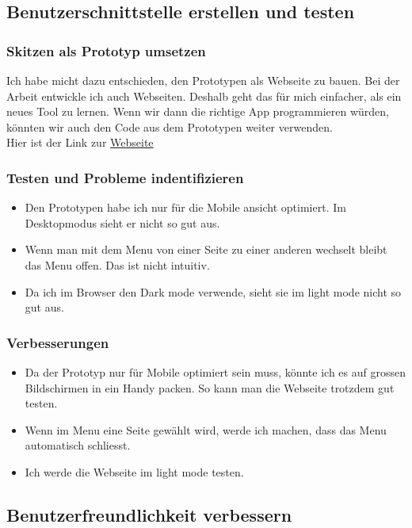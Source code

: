 \documentclass[10pt]{article}
\begin{document}
	\subsection{Benutzerschnittstelle erstellen und testen}
	\subsubsection{Skitzen als Prototyp umsetzen}
	Ich habe micht dazu entschieden, den Prototypen als Webseite zu bauen. Bei der Arbeit entwickle ich auch Webseiten. Deshalb geht das für mich einfacher, als ein neues Tool zu lernen. Wenn wir dann die richtige App programmieren würden, könnten wir auch den Code aus dem Prototypen weiter verwenden.\\
	Hier ist der Link zur \href{https://davidhafner.github.io/M322-Documentation/}{Webseite}
	\subsubsection{Testen und Probleme indentifizieren}
	\begin{itemize}
		\item Den Prototypen habe ich nur für die Mobile ansicht optimiert. Im Desktopmodus sieht er nicht so gut aus.
		\item Wenn man mit dem Menu von einer Seite zu einer anderen wechselt bleibt das Menu offen. Das ist nicht intuitiv.
		\item Da ich im Browser den Dark mode verwende, sieht sie im light mode nicht so gut aus.
	\end{itemize}
	\subsubsection{Verbesserungen}
	\begin{itemize}
		\item Da der Prototyp nur für Mobile optimiert sein muss, könnte ich es auf grossen Bildschirmen in ein Handy packen. So kann man die Webseite trotzdem gut testen.
		\item Wenn im Menu eine Seite gewählt wird, werde ich machen, dass das Menu automatisch schliesst.
		\item Ich werde die Webseite im light mode testen.
	\end{itemize}
	\subsection{Benutzerfreundlichkeit verbessern}
	
	
	
\end{document}
